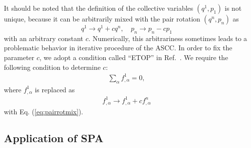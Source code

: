 \documentclass[%
superscriptaddress,
showpacs,
nofootinbib,
amsmath,amssymb,
aps,
prc,
twocolumn,
floatfix ]%
{revtex4-1}
\begin{document}

It should be noted \cite{N2012} that the definition of the collective
variables $(q^1,p_1)$ is not unique, because it can be arbitrarily mixed
with the pair rotation $(q^n,p_n)$ as
\begin{equation}
	q^1 \rightarrow q^1 + c q^n,  \quad
	p_n \rightarrow p_n -c p_1 \label{eq:pairrotmix}
\end{equation}
with an arbitrary constant $c$.
Numerically, this arbitrariness sometimes leads to a problematic behavior 
in iterative procedure of the ASCC.
In order to fix the parameter $c$, we adopt a condition
called ``ETOP'' in Ref.~\cite{HNMM07}.
We require the following condition to determine $c$:
\begin{align}
\sum_\alpha 
	f^1_{,\alpha} = 0 ,
\end{align}
where $f^1_{,\alpha}$ is replaced as
\begin{align}
{f}^1_{,\alpha} \to f^1_{,\alpha} + c f^n_{,\alpha}
  \label{f}
\end{align}
with Eq. (\ref{eq:pairrotmix}).


\subsection{Application of SPA}
\end{document}
